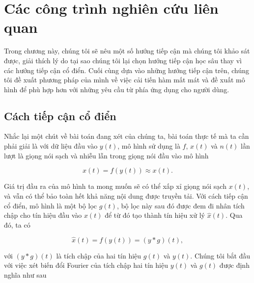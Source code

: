 \newcommand{\rlimg}[1]{parts/relatedworks/img/#1}
\setupfont{13pt}

\chapter{Các công trình nghiên cứu liên quan} \label{chapter::relatedworks}
	
	Trong chương này, chúng tôi sẽ nêu một số hướng tiếp cận mà chúng tôi khảo sát được, giải thích lý do tại sao chúng tôi lại chọn hướng tiếp cận học sâu thay vì các hướng tiếp cận cổ điển. Cuối cùng dựa vào những hướng tiếp cận trên, chúng tôi đề xuất phương pháp của mình về việc cải tiến hàm mất mát và đề xuất mô hình để phù hợp hơn với những yêu cầu từ phía ứng dụng cho người dùng.
	
\section{Cách tiếp cận cổ điển}\label{section::relatedworks::traditional_approach}

	Nhắc lại một chút về bài toán đang xét của chúng ta, bài toán thực tế mà ta cần phải giải là với dữ liệu đầu vào $y(t)$, mô hình sử dụng là $f$, $x(t)$ và $n(t)$ lần lượt là giọng nói sạch và nhiễu lẫn trong giọng nói đầu vào mô hình
	
		\begin{equation}
			\hat{x}(t) = f(y(t)) \approx x(t).
		\end{equation}
		
	Giá trị đầu ra của mô hình ta mong muốn sẽ có thể xấp xỉ giọng nói sạch $x(t)$, và vẫn có thể bảo toàn hết khả năng nội dung được truyền tải. Với cách tiếp cận cổ điển, mô hình là một bộ lọc $g(t)$, bộ lọc này sau đó được đem đi nhân tích chập cho tín hiệu đầu vào $x(t)$ để từ đó tạo thành tín hiệu xử lý $\hat{x}(t)$. Qua đó, ta có
	
		\begin{equation}
			\hat{x}(t) = f(y(t)) = (y \ast g)(t),
		\end{equation}
	
	\noindent với $(y \ast g)(t)$ là tích chập của hai tín hiệu $g(t)$ và $y(t)$. Chúng tôi bắt đầu với việc xét biến đổi Fourier của tích chập hai tín hiệu $y(t)$ và $g(t)$ được định nghĩa như sau
	
